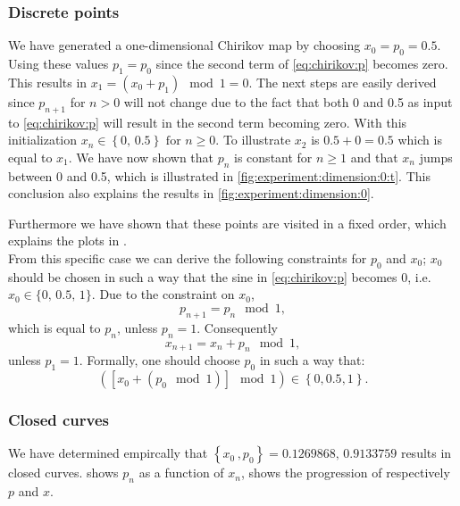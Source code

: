 	\subsubsection{Discrete points}
	We have generated a one-dimensional Chirikov map by choosing $x_0 = p_0 = 0.5$. Using these values $p_1 = p_0$ since the second term of \eqref{eq:chirikov:p} becomes zero. This results in $x_1 = \left( x_0 + p_{1} \right) \mod 1= 0$. The next steps are easily derived since $p_{n + 1}$ for $n > 0$ will not change due to the fact that both 0 and 0.5 as input to \eqref{eq:chirikov:p} will result in the second term becoming zero. With this initialization $x_{n} \in \left\{0,\, 0.5 \right\} \text{ for } n \geq 0$. To illustrate $x_2$ is $0.5 + 0 = 0.5$ which is equal to $x_1$. We have now shown that $p_n$ is constant for $n \geq 1$ and that $x_n$ jumps between 0 and 0.5, which is illustrated in \cref{fig:experiment:dimension:0:t}. This conclusion also explains the results in \cref{fig:experiment:dimension:0}. 

	Furthermore we have shown that these points are visited in a fixed order, which explains the plots in .\\

	From this specific case we can derive the following constraints for $p_0$ and $x_0$; $x_0$ should be chosen in such a way that the sine in \cref{eq:chirikov:p} becomes 0, i.e. $x_0 \in \{0,\, 0.5,\, 1\}$. Due to the constraint on $x_0$,
	\begin{equation*}
	p_{n + 1} = p_{n} \mod 1,
	\end{equation*}
 	which is equal to $p_n$, unless $p_n = 1$. Consequently
 	\begin{equation*}
 	x_{n + 1} = x_n + p_n \mod 1,
 	\end{equation*}
	unless $p_1 = 1$. Formally, one should choose $p_0$ in such a way that:
	\begin{equation*}
		\left( \left[ x_0 + (p_0 \mod 1)\right] \mod 1 \right) \in \left\{0, 0.5, 1\right\}.
	\end{equation*}

	\subsubsection{Closed curves}
	We have determined empircally that $\left\{x_0\,, p_0 \right\} = {\num{0.1269868},\,\num{0.9133759}}$ results in closed curves.  shows $p_n$ as a function of $x_n$,  shows the progression of respectively $p$ and $x$.\\

